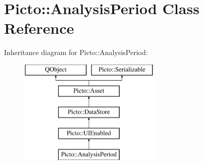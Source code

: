 \hypertarget{class_picto_1_1_analysis_period}{\section{Picto\-:\-:Analysis\-Period Class Reference}
\label{class_picto_1_1_analysis_period}
}
Inheritance diagram for Picto\-:\-:Analysis\-Period\-:\begin{figure}[H]
\begin{center}
\leavevmode
\includegraphics[height=5.000000cm]{class_picto_1_1_analysis_period}
\end{center}
\end{figure}
